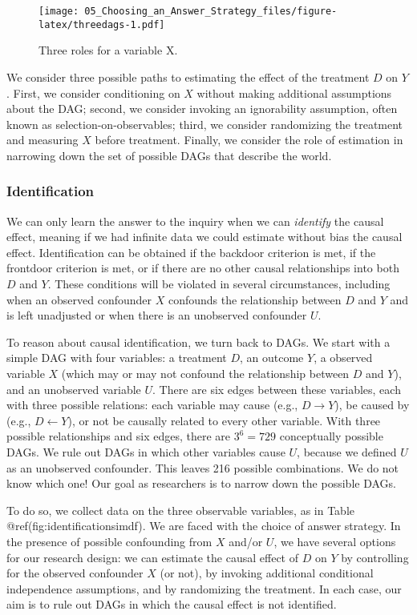 \documentclass[
]{article}
\begin{document}
\begin{figure}
\centering
\texttt{[image: 05\_Choosing\_an\_Answer\_Strategy\_files/figure-latex/threedags-1.pdf]}
\caption{Three roles for a variable X.}
\end{figure}

We consider three possible paths to estimating the effect of the
treatment \(D\) on \(Y\). First, we consider conditioning on \(X\)
without making additional assumptions about the DAG; second, we consider
invoking an ignorability assumption, often known as
selection-on-observables; third, we consider randomizing the treatment
and measuring \(X\) before treatment. Finally, we consider the role of
estimation in narrowing down the set of possible DAGs that describe the
world.

\hypertarget{identification}{%
\subsubsection{Identification}\label{identification}}

We can only learn the answer to the inquiry when we can \emph{identify}
the causal effect, meaning if we had infinite data we could estimate
without bias the causal effect. Identification can be obtained if the
backdoor criterion is met, if the frontdoor criterion is met, or if
there are no other causal relationships into both \(D\) and \(Y\). These
conditions will be violated in several circumstances, including when an
observed confounder \(X\) confounds the relationship between \(D\) and
\(Y\) and is left unadjusted or when there is an unobserved confounder
\(U\).

To reason about causal identification, we turn back to DAGs. We start
with a simple DAG with four variables: a treatment \(D\), an outcome
\(Y\), a observed variable \(X\) (which may or may not confound the
relationship between \(D\) and \(Y\)), and an unobserved variable \(U\).
There are six edges between these variables, each with three possible
relations: each variable may cause (e.g., \(D \rightarrow Y\)), be
caused by (e.g., \(D \leftarrow Y\)), or not be causally related to
every other variable. With three possible relationships and six edges,
there are \(3^6 = 729\) conceptually possible DAGs. We rule out DAGs in
which other variables cause \(U\), because we defined \(U\) as an
unobserved confounder. This leaves 216 possible combinations. We do not
know which one! Our goal as researchers is to narrow down the possible
DAGs.

To do so, we collect data on the three observable variables, as in Table
@ref(fig:identificationsimdf). We are faced with the choice of answer
strategy. In the presence of possible confounding from \(X\) and/or
\(U\), we have several options for our research design: we can estimate
the causal effect of \(D\) on \(Y\) by controlling for the observed
confounder \(X\) (or not), by invoking additional conditional
independence assumptions, and by randomizing the treatment. In each
case, our aim is to rule out DAGs in which the causal effect is not
identified.
\end{document}
